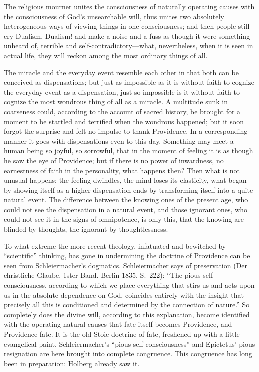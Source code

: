 \documentclass[12pt]{book}
\newcommand{\opage}[1]{\marginnote{\footnotesize\textit{[#1]}}}
\begin{document}
The religious mourner unites the consciousness of naturally operating
causes with the consciousness of God's unsearchable will, thus unites
two absolutely heterogeneous ways of viewing things in one
consciousness; and then people still cry Dualism, Dualism! and make a
noise and a fuss as though it were something unheard of, terrible and
self-contradictory---what, nevertheless, when it is seen in actual life,
they will reckon among the most ordinary things of all.

The miracle and the everyday event resemble each other in that both can
be conceived as dispensations; but just as impossible as it is without
faith to cognize the everyday event as a dispensation, just so
impossible is it without faith to cognize the most wondrous thing of all
as a miracle. A multitude sunk in coarseness could, according to the
account of sacred history, be brought for a moment to be startled and
terrified when the wondrous happened; but it soon forgot the surprise
and felt no impulse to thank Providence. In a corresponding manner it
goes with dispensations even to this day. Something may meet a human
being so joyful, so sorrowful, that in the moment of feeling it is as
though he saw the eye of Providence; but if there is no power of
inwardness, no earnestness of faith in the personality, what happens
then? Then what is not unusual happens: the feeling dwindles, the mind
loses its elasticity, what began by showing itself as a higher
dispensation ends by transforming itself into a quite natural event.
The difference between the knowing ones of the present age, who could
not see the dispensation in a natural event, and those ignorant ones,
who could not see it in the signs of omnipotence,
\opage{220}\setcounter{footnote}{0}%
is only this, that the knowing are blinded by thoughts, the ignorant by
thoughtlessness.

To what extreme the more recent theology, infatuated and bewitched by
``scientific'' thinking, has gone in undermining the doctrine of
Providence can be seen from Schleiermacher's dogmatics. Schleiermacher
says of preservation (Der christliche Glaube. 1ster Band. Berlin 1835.
S.~222): ``The pious self-consciousness, according to which we place
everything that stirs us and acts upon us in the absolute dependence on
God, coincides entirely with the insight that precisely all this is
conditioned and determined by the connection of nature.'' So completely
does the divine will, according to this explanation, become identified
with the operating natural causes that fate itself becomes Providence,
and Providence fate. It is the old Stoic doctrine of fate, freshened up
with a little evangelical paint. Schleiermacher's ``pious
self-consciousness'' and Epictetus' pious resignation are here brought
into complete congruence. This congruence has long been in preparation:
Holberg already saw it.
\end{document}
